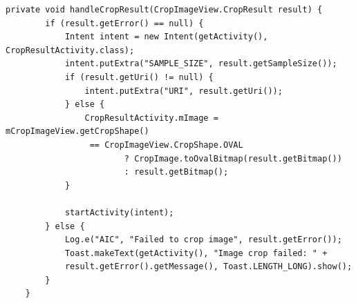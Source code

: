 \begin{verbatim}
private void handleCropResult(CropImageView.CropResult result) {
        if (result.getError() == null) {
            Intent intent = new Intent(getActivity(), CropResultActivity.class);
            intent.putExtra("SAMPLE_SIZE", result.getSampleSize());
            if (result.getUri() != null) {
                intent.putExtra("URI", result.getUri());
            } else {
                CropResultActivity.mImage = mCropImageView.getCropShape()
                 == CropImageView.CropShape.OVAL
                        ? CropImage.toOvalBitmap(result.getBitmap())
                        : result.getBitmap();
            }

            startActivity(intent);
        } else {
            Log.e("AIC", "Failed to crop image", result.getError());
            Toast.makeText(getActivity(), "Image crop failed: " + 
            result.getError().getMessage(), Toast.LENGTH_LONG).show();
        }
    }
\end{verbatim}
